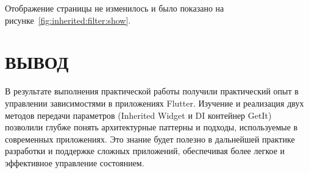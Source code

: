 Отображение страницы не изменилось и было показано
на рисунке~\ref{fig:inherited:filter:show}.

\clearpage

\section*{ВЫВОД}

В результате выполнения практической работы получили практический опыт
в управлении зависимостями в приложениях Flutter.
Изучение и реализация двух методов передачи параметров
(Inherited Widget и DI контейнер GetIt)
позволили глубже понять архитектурные паттерны и подходы,
используемые в современных приложениях.
Это знание будет полезно в дальнейшей практике разработки
и поддержке сложных приложений, обеспечивая более легкое
и эффективное управление состоянием.

